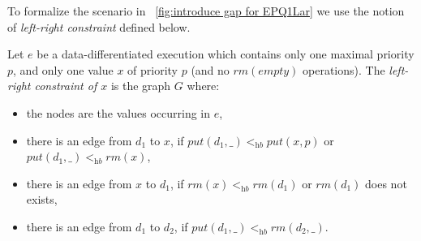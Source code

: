 To formalize the scenario in \figurename~\ref{fig:introduce gap for EPQ1Lar} we use the notion of \emph{left-right constraint} defined below.

\begin{definition}\label{def:left-right constraint for matched put and rm operations}
Let $e$ be a data-differentiated execution which contains only one maximal priority $p$, and only one value $x$ of priority $p$ (and no $\textit{rm}(\textit{empty})$ operations).
The \emph{left-right constraint of $x$} is the graph $G$ where: %
\begin{itemize}
\item the nodes are the values occurring in $e$, %
\item there is an edge from $d_1$ to $x$, if $\textit{put}(d_1,\_) <_{\textit{hb}} \textit{put}(x,p)$ or $\textit{put}(d_1,\_) <_{\textit{hb}} \textit{rm}(x)$,
\item there is an edge from $x$ to $d_1$, if $\textit{rm}(x)<_{\textit{hb}}\textit{rm}(d_1)$ or $\textit{rm}(d_1)$ does not exists,
\item there is an edge from $d_1$ to $d_2$, if $\textit{put}(d_1,\_) <_{\textit{hb}} \textit{rm}(d_2,\_)$.
\end{itemize}
\end{definition}

